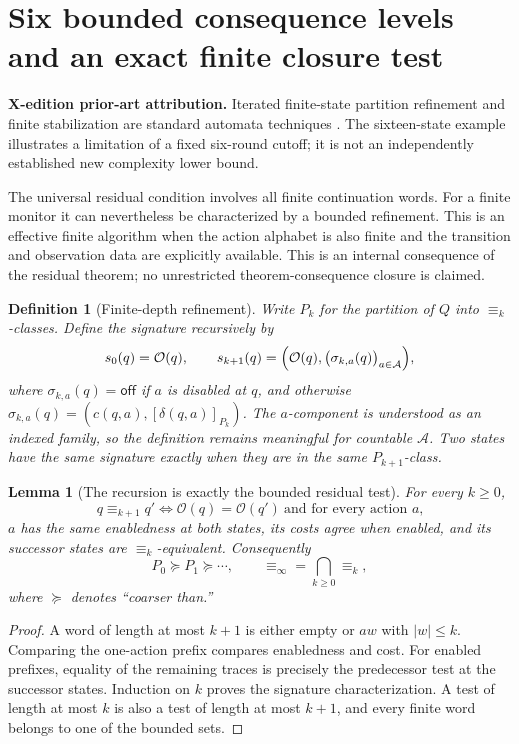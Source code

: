 \documentclass[11pt,letterpaper]{article}
\newcommand{\PriorArtNote}[1]{%
\par\smallskip\noindent\begin{minipage}{\linewidth}\small\color{black!85}%
\textbf{X-edition prior-art attribution.} #1\end{minipage}\par\smallskip}
\newtheorem{lemma}[theorem]{Lemma}
\newtheorem{definition}[theorem]{Definition}
\newcommand{\Ob}{\mathcal{O}}
\newcommand{\ACT}{\mathcal{A}}
\newcommand{\Rinf}{\equiv_{\!\infty}}
\newcommand{\Rk}[1]{\equiv_{\!#1}}
\begin{document}
\section{Six bounded consequence levels and an exact finite closure test}
\PriorArtNote{Iterated finite-state partition refinement and finite stabilization are standard automata techniques \cite{nerode}. The sixteen-state example illustrates a limitation of a fixed six-round cutoff; it is not an independently established new complexity lower bound.}
The universal residual condition involves all finite continuation words. For a finite monitor it can nevertheless be characterized by a bounded refinement. This is an effective finite algorithm when the action alphabet is also finite and the transition and observation data are explicitly available. This is an internal consequence of the residual theorem; no unrestricted theorem-consequence closure is claimed.
\begin{definition}[Finite-depth refinement]\label{def:refine}
Write $P_k$ for the partition of $Q$ into $\Rk{k}$-classes. Define the signature recursively by
\[
 s_0(q)=\Ob(q),\qquad
 s_{k+1}(q)=\Bigl(\Ob(q),\bigl(\sigma_{k,a}(q)\bigr)_{a\in\ACT}\Bigr),
\]
where $\sigma_{k,a}(q)=\mathsf{off}$ if $a$ is disabled at $q$, and otherwise
$\sigma_{k,a}(q)=(c(q,a),[\delta(q,a)]_{P_k})$. The $a$-component is understood as an indexed family, so the definition remains meaningful for countable $\ACT$. Two states have the same signature exactly when they are in the same $P_{k+1}$-class.
\end{definition}
\begin{lemma}[The recursion is exactly the bounded residual test]\label{lem:refine}
For every $k\ge0$,
\[
 q\Rk{k+1}q' \iff
 \Ob(q)=\Ob(q')\ \text{and for every action $a$,}
\]
$a$ has the same enabledness at both states, its costs agree when enabled, and its successor states are $\Rk{k}$-equivalent. Consequently
\[
 P_0\succeq P_1\succeq\cdots,\qquad
 \Rinf=\bigcap_{k\ge0}\Rk{k},
\]
where $\succeq$ denotes ``coarser than.''
\end{lemma}
\begin{proof}
A word of length at most $k+1$ is either empty or $aw$ with $|w|\le k$. Comparing the one-action prefix compares enabledness and cost. For enabled prefixes, equality of the remaining traces is precisely the predecessor test at the successor states. Induction on $k$ proves the signature characterization. A test of length at most $k$ is also a test of length at most $k+1$, and every finite word belongs to one of the bounded sets.
\end{proof}
\end{document}

